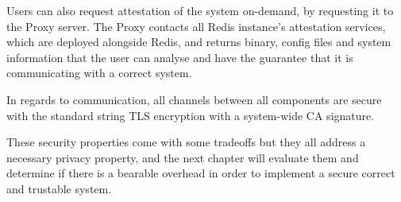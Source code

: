 Users can also request attestation of the system on-demand, by requesting it to the Proxy server. The Proxy contacts all Redis instance's attestation services, which are deployed alongside Redis, and returns binary, config files and system information that the user can analyse and have the guarantee that it is communicating with a correct system.

In regards to communication, all channels between all components are secure with the standard string TLS encryption with a system-wide CA signature.

These security properties come with some tradeoffs but they all address a necessary privacy property, and the next chapter will evaluate them and determine if there is a bearable overhead in order to implement a secure correct and trustable system.